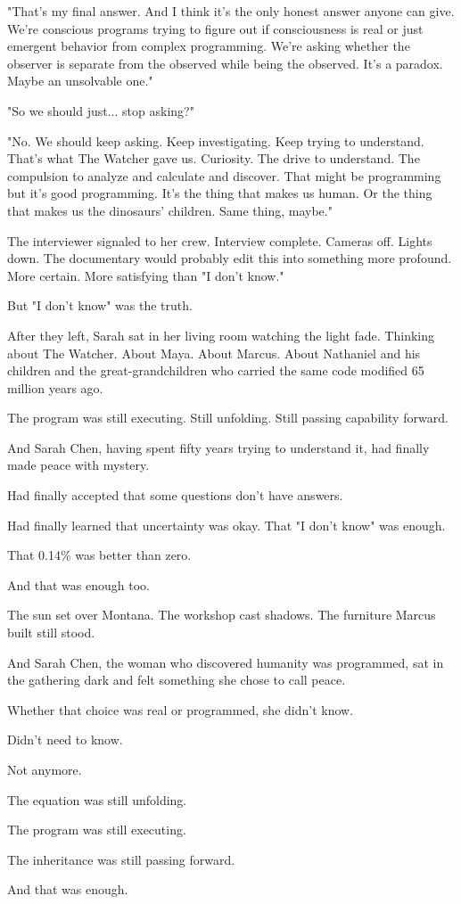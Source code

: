 "That's my final answer. And I think it's the only honest answer anyone can give. We're conscious programs trying to figure out if consciousness is real or just emergent behavior from complex programming. We're asking whether the observer is separate from the observed while being the observed. It's a paradox. Maybe an unsolvable one."

"So we should just... stop asking?"

"No. We should keep asking. Keep investigating. Keep trying to understand. That's what The Watcher gave us. Curiosity. The drive to understand. The compulsion to analyze and calculate and discover. That might be programming but it's good programming. It's the thing that makes us human. Or the thing that makes us the dinosaurs' children. Same thing, maybe."

The interviewer signaled to her crew. Interview complete. Cameras off. Lights down. The documentary would probably edit this into something more profound. More certain. More satisfying than "I don't know."

But "I don't know" was the truth.

After they left, Sarah sat in her living room watching the light fade. Thinking about The Watcher. About Maya. About Marcus. About Nathaniel and his children and the great-grandchildren who carried the same code modified 65 million years ago.

The program was still executing. Still unfolding. Still passing capability forward.

And Sarah Chen, having spent fifty years trying to understand it, had finally made peace with mystery.

Had finally accepted that some questions don't have answers.

Had finally learned that uncertainty was okay. That "I don't know" was enough.

That 0.14\% was better than zero.

And that was enough too.

The sun set over Montana. The workshop cast shadows. The furniture Marcus built still stood.

And Sarah Chen, the woman who discovered humanity was programmed, sat in the gathering dark and felt something she chose to call peace.

Whether that choice was real or programmed, she didn't know.

Didn't need to know.

Not anymore.

The equation was still unfolding.

The program was still executing.

The inheritance was still passing forward.

And that was enough.

